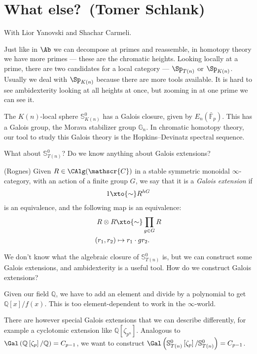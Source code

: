 \renewcommand{\thespeaker}{Tomer Schlank}
\renewcommand{\thetitle}{What else?}
\section{\thetitle~(\thespeaker)}

With Lior Yanovski and Shachar Carmeli.

Just like in $\Ab$ we can decompose at primes and reassemble, in homotopy theory we have more primes --- these are the chromatic heights. Looking locally at a prime, there are two candidates for a local category --- $\Sp_{T(n)}$ or $\Sp_{K(n)}$. Usually we deal with $\Sp_{K(n)}$ because there are more tools available. It is hard to see ambidexterity looking at all heights at once, but zooming in at one prime we can see it.

The $K(n)$-local sphere $\mathbb{S}^0_{K(n)}$ has a Galois closure, given by $E_n \left( \bar{\mathbb{F}}_p \right)$. This has a Galois group, the Morava stabilizer group $\mathbb{G}_n$. In chromatic homotopy theory, our tool to study this Galois theory is the Hopkins--Devinatz spectral sequence.

What about $\mathbb{S}^0_{T(n)}$? Do we know anything about Galois extensions?

\begin{definition} (Rognes) Given $R \in \CAlg(\mathscr{C})$ in a stable symmetric monoidal $\infty$-category, with an action of a finite group $G$, we say that it is a \textit{Galois extension} if
\begin{align*}
    1 \xto{\sim} R^{hG}
\end{align*}
is an equivalence, and the following map is an equivalence:
\begin{align*}
    R \otimes R &\xto{\sim} \prod_{g\in G} R \\
    (r_1,r_2) &\mapsto r_1 \cdot gr_2.
\end{align*}
\end{definition}

We don't know what the algebraic closure of $\mathbb{S}^0_{T(n)}$ is, but we can construct some Galois extensions, and ambidexterity is a useful tool. How do we construct Galois extensions?

Given our field $\mathbb{Q}$, we have to add an element and divide by a polynomial to get $\mathbb{Q}[x]/f(x)$. This is too element-dependent to work in the $\infty$-world.

There are however special Galois extensions that we can describe differently, for example a cyclotomic extension like $\mathbb{Q} \left[\zeta_{p^n} \right]$. Analogous to $\Gal \left( \mathbb{Q} \left[ \zeta_p \right] / \mathbb{Q} \right) = C_{p-1}$, we want to construct $\Gal \left( \mathbb{S}^0_{T(n)} \left[ \zeta_p \right] / \mathbb{S}^0_{T(n)} \right) = C_{p-1}$.

